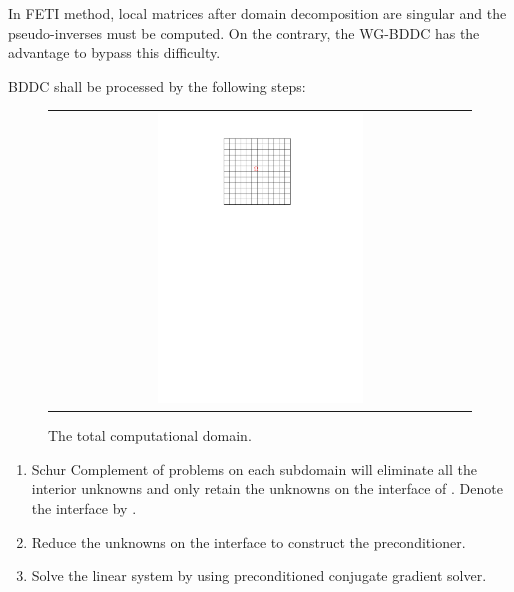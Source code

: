 In FETI method, local matrices after domain decomposition are singular and the pseudo-inverses must be computed. On the contrary, the WG-BDDC has the advantage to bypass this difficulty.

BDDC shall be processed by the following steps:

\begin{figure}[h]
	\centering
	\begin{tabular}{c}
		\includegraphics[width=0.5\textwidth]{./pics/domain.pdf}
	\end{tabular}
	\caption{\footnotesize The total computational domain.}\label{fig3: domain}
\end{figure}

\begin{enumerate}
	\item	Schur Complement \cite{duff1986direct} of problems on each subdomain  will eliminate all the interior unknowns and only retain the unknowns on the interface of . Denote the interface by .
	\item	Reduce the unknowns on the interface to construct the preconditioner.
	\item	Solve the linear system by using preconditioned conjugate gradient solver.
\end{enumerate}


